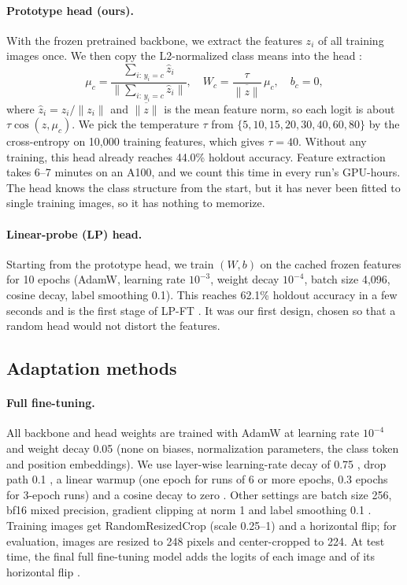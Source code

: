 \paragraph{Prototype head (ours).}
With the frozen pretrained backbone, we extract the features $z_i$ of all training images once.
We then copy the L2-normalized class means into the head \citep{snell2017prototypical,qi2018imprinted}:
\begin{equation}
  \mu_c = \frac{\sum_{i:\,y_i=c} \hat z_i}{\big\|\sum_{i:\,y_i=c} \hat z_i\big\|}, \quad
  W_c = \frac{\tau}{\overline{\|z\|}}\, \mu_c, \quad b_c = 0,
  \label{eq:proto}
\end{equation}
where $\hat z_i = z_i / \|z_i\|$ and $\overline{\|z\|}$ is the mean feature norm, so each logit is about $\tau \cos(z, \mu_c)$.
We pick the temperature $\tau$ from $\{5, 10, 15, 20, 30, 40, 60, 80\}$ by the cross-entropy on 10,000 training features, which gives $\tau = 40$.
Without any training, this head already reaches 44.0\% holdout accuracy.
Feature extraction takes 6--7 minutes on an A100, and we count this time in every run's GPU-hours.
The head knows the class structure from the start, but it has never been fitted to single training images, so it has nothing to memorize.

\paragraph{Linear-probe (LP) head.}
Starting from the prototype head, we train $(W, b)$ on the cached frozen features for 10 epochs (AdamW, learning rate $10^{-3}$, weight decay $10^{-4}$, batch size 4,096, cosine decay, label smoothing 0.1).
This reaches 62.1\% holdout accuracy in a few seconds and is the first stage of LP-FT \citep{kumar2022lpft}.
It was our first design, chosen so that a random head would not distort the features.

\subsection{Adaptation methods}
\label{sec:peft}

\paragraph{Full fine-tuning.}
All backbone and head weights are trained with AdamW \citep{loshchilov2019adamw} at learning rate $10^{-4}$ and weight decay 0.05 (none on biases, normalization parameters, the class token and position embeddings).
We use layer-wise learning-rate decay of 0.75 \citep{bao2022beit}, drop path 0.1 \citep{huang2016stochastic}, a linear warmup (one epoch for runs of 6 or more epochs, 0.3 epochs for 3-epoch runs) and a cosine decay to zero \citep{loshchilov2017sgdr}.
Other settings are batch size 256, bf16 mixed precision, gradient clipping at norm 1 and label smoothing 0.1 \citep{szegedy2016rethinking}.
Training images get RandomResizedCrop (scale 0.25--1) and a horizontal flip; for evaluation, images are resized to 248 pixels and center-cropped to 224.
At test time, the final full fine-tuning model adds the logits of each image and of its horizontal flip \citep{krizhevsky2012imagenet}.

